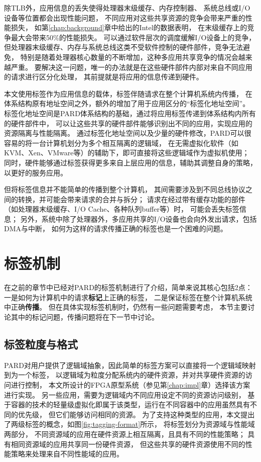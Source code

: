 除TLB外，应用信息的丢失使得处理器末级缓存、内存控制器、
系统总线或I/O设备等位置都会出现性能问题，
不同应用对这些共享资源的竞争会带来严重的性能损失，
如第\ref{chap:background}章中给出的Intel的数据表明，
在末级缓存上的竞争最大会带来50\%的性能损失\cite{}。
可以通过软件层次的调度缓解I/O设备上的竞争，
但处理器末级缓存、内存与系统总线这类不受软件控制的硬件部件，竞争无法避免，
特别是随着处理器核心数量的不断增加，这种多应用共享竞争的情况会越来越严重。
要解决这一问题，唯一的办法就是在这些硬件部件内部对来自不同应用的请求进行区分化处理，
其前提就是将应用的信息传递到硬件。

本文使用标签作为应用信息的载体，标签伴随请求在整个计算机系统内传播，
在体系结构原有地址空间之外，额外的增加了用于应用区分的``标签化地址空间''。
标签化地址空间是PARD体系结构的基础，通过将应用标签传递到体系结构内所有的硬件部件中，
可以让这些共享的硬件部件能够识别出不同的应用，实现应用的资源隔离与性能隔离。
通过标签化地址空间以及少量的硬件修改，PARD可以很容易的将一台计算机划分为多个相互隔离的逻辑域，
在无需虚拟化软件（如KVM、Xen、VMware等）的辅助下，即可直接将这些逻辑域作为虚拟机使用；
同时，硬件能够通过标签获得更多来自上层应用的信息，辅助其调整自身的策略，以更好的服务应用。

但将标签信息并不能简单的传播到整个计算机，
其间需要涉及到不同总线协议之间的转换，并可能会带来请求的合并与拆分；
请求在经过带有缓存功能的部件（如处理器末级缓存、I/O Cache、各种队列buffer等）时，
可能会丢失标签信息；
另外，系统中除了处理器外，多应用共享的I/O设备也会向外发出请求，包括DMA与中断，
如何为这样的请求传播正确的标签也是一个困难的问题。


\section{标签机制}

在之前的章节中已经对PARD的标签机制进行了介绍，简单来说其核心包括2点：
一是如何为计算机中的请求\textbf{标记}上正确的标签，
二是保证标签在整个计算机系统中正确\textbf{传播}。
但在具体实现标签机制时，仍然有一些问题需要考虑，
本节主要讨论其中的标记问题，传播问题将在下一节中讨论。


\subsection{标签粒度与格式}

PARD对用户提供了逻辑域抽象，因此简单的标签方案可以直接将一个逻辑域映射到为一个标签，
以逻辑域为粒度分配系统内的硬件资源，并对共享硬件资源的访问进行控制，
本文所设计的FPGA原型系统（参见第\ref{chap:impl}章）选择该方案进行实现。
另一些应用，需要为逻辑域内不同应用设定不同的资源访问级别，
基于容器的技术的轻量级虚拟化即属于该类型，运行在不同容器中的应用虽然具有不同的优先级，
但它们能够访问相同的资源。
为了支持这种类型的应用，本文提出了两级标签的概念，如图\ref{fig:tagging-format}所示，
将标签划分为资源域与性能域两部分，
不同资源域的应用在硬件资源上相互隔离，且具有不同的性能策略；
具有相同资源域的应用共享同一份硬件资源，
但这些共享的硬件资源使用不同的性能策略来处理来自不同性能域的应用。

